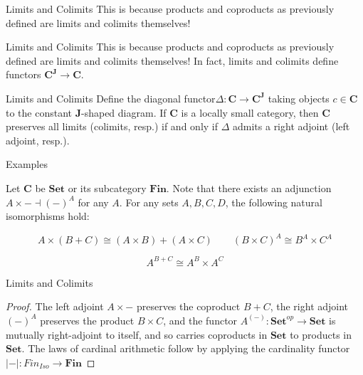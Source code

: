 \documentclass[tikz]{beamer}
\theoremstyle{definition}
\newcommand{\cat}[1]{\mathbf{#1}}
\begin{document}
\begin{frame}{Limits and Colimits}
This is because products and coproducts as previously defined are limits and colimits themselves!
\end{frame}

\begin{frame}{Limits and Colimits}
This is because products and coproducts as previously defined are limits and colimits themselves! In fact, limits and colimits define functors $\cat{C}^{\cat{J}} \to \cat{C}$. 
\end{frame}


\begin{frame}{Limits and Colimits}
Define the diagonal functor$ \Delta : \cat{C} \to \cat{C}^{\cat{J}}$ taking objects $c \in \cat{C}$ to the constant $\cat{J}$-shaped diagram. If $\cat{C}$ is a locally small category, then $\cat{C}$ preserves all limits (colimits, resp.) if and only if $\Delta$ admits a right adjoint (left adjoint, resp.). 
\end{frame}

\begin{frame}{Examples}

Let $\cat{C}$ be $\cat{Set}$ or its subcategory $\cat{Fin}$. Note that there exists an adjunction $A \times - \dashv (-)^A$ for any $A$. For any sets $A, B, C, D$, the following natural isomorphisms hold: 

\begin{center}
\begin{equation*}
A \times (B + C) \cong (A \times B) + (A \times C) \qquad (B \times C)^A \cong B^A \times C^A
\end{equation*}

\begin{equation*}
A^{B + C} \cong A^B \times A^C
\end{equation*}
\end{center}


\end{frame}

\begin{frame}{Limits and Colimits}
\begin{proof}
The left adjoint $A \times -$ preserves the coproduct $B + C$, the right adjoint $(-)^A$ preserves the product $B \times C$, and the functor $A^{(-)}: \cat{Set}^{op} \to \cat{Set}$ is mutually right-adjoint to itself, and so carries coproducts in $\cat{Set}$ to products in $\cat{Set}$. The laws of cardinal arithmetic follow by applying the cardinality functor $|-|: Fin_{Iso} \to \cat{Fin}$

\end{proof}
\end{frame}
\end{document}
